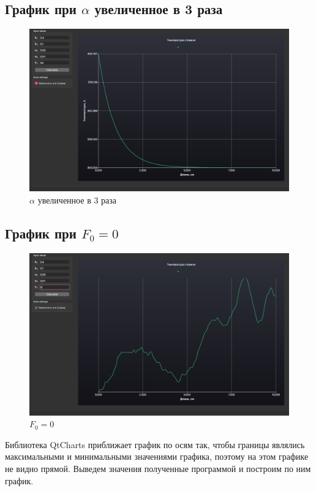 \subsection{График при $\alpha$ увеличенное в 3 раза}

\begin{figure}[H]
    \centering
    \includegraphics[scale=0.35]{img/AlphaX3.png}
    \caption{$\alpha$ увеличенное в 3 раза}
\end{figure}

\subsection{График при $F_0 = 0$}

\begin{figure}[H]
    \centering
    \includegraphics[scale=0.35]{img/Zero.png}
    \caption{$F_0 = 0$}
\end{figure}

Библиотека {\ttfamily QtCharts} приближает график по осям так, чтобы границы являлись максимальными и минимальными значениями графика, поэтому на этом графике не видно прямой. Выведем значения полученные программой и построим по ним график.

